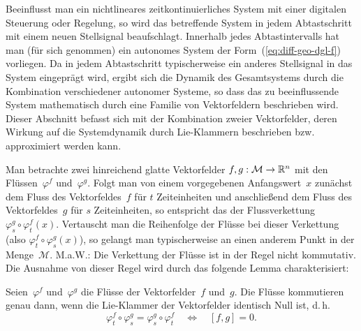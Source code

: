 Beeinflusst man ein nichtlineares zeitkontinuierliches System mit
einer digitalen Steuerung oder Regelung, so wird das betreffende System
in jedem Abtastschritt mit einem neuen Stellsignal beaufschlagt. Innerhalb
jedes Abtastintervalls hat man (für sich genommen) ein autonomes System
der Form~(\ref{eq:diff-geo-dgl-f}) vorliegen. Da in jedem Abtastschritt
typischerweise ein anderes Stellsignal in das System eingeprägt wird,
ergibt sich die Dynamik des Gesamtsystems durch die Kombination verschiedener
autonomer Systeme, so dass das zu beeinflussende System mathematisch
durch eine Familie von Vektorfeldern beschrieben wird. Dieser Abschnitt
befasst sich mit der Kombination zweier Vektorfelder, deren Wirkung
auf die Systemdynamik durch Lie-Klammern beschrieben bzw. approximiert
werden kann.

Man betrachte zwei hinreichend glatte Vektorfelder $f,g:\mathcal{M}\to{\mathbb{R}}^{n}$
mit den Flüssen~$\varphi^{f}$ und~$\varphi^{g}$. Folgt man von
einem vorgegebenen Anfangswert~$x$ zunächst dem Fluss des Vektorfeldes~$f$
für $t$ Zeiteinheiten und anschließend dem Fluss des Vektorfeldes~$g$
für $s$ Zeiteinheiten, so entspricht das der Flussverkettung $\varphi_{s}^{g}\circ\varphi_{t}^{f}(x)$.
Vertauscht man die Reihenfolge der Flüsse bei dieser Verkettung (also
$\varphi_{t}^{f}\circ\varphi_{s}^{g}(x)$), so gelangt man typischerweise
an einen anderem Punkt in der Menge~$\mathcal{M}$. M.a.W.: Die Verkettung
der Flüsse ist in der Regel nicht kommutativ.
Die Ausnahme von dieser Regel wird durch das folgende Lemma charakterisiert:
\begin{lemma}
\label{lem:kommutierende-fluesse}Seien~$\varphi^{f}$ und~$\varphi^{g}$
die Flüsse der Vektorfelder~$f$ und~$g$. Die Flüsse kommutieren
genau dann, wenn die Lie-Klammer der Vektorfelder identisch Null ist,
d.\,h. 
\begin{equation}
\varphi_{t}^{f}\circ\varphi_{s}^{g}=\varphi_{s}^{g}\circ\varphi_{t}^{f}\quad\Longleftrightarrow\quad[f,g]=0.\label{eq:kommutiernde-fluesse}
\end{equation}
\end{lemma}
